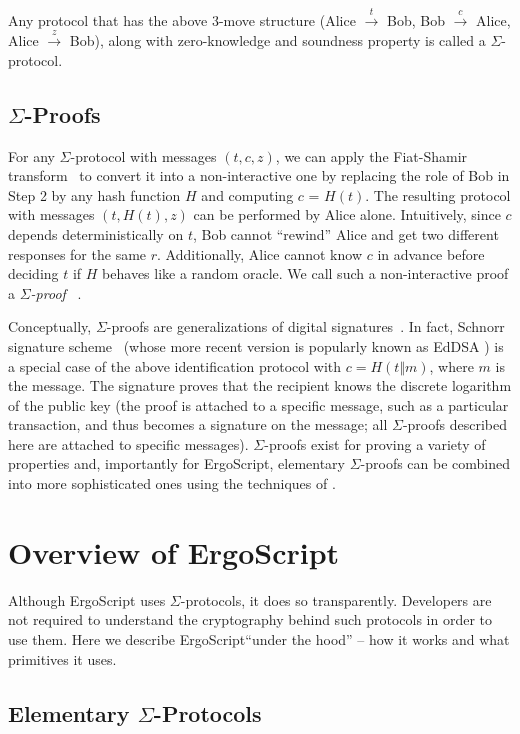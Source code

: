 \documentclass[11pt]{article}
\newcommand{\langname}{ErgoScript\xspace}
\begin{document}
Any protocol that has the above 3-move structure (Alice $\stackrel{t}{\rightarrow}$ Bob, Bob $\stackrel{c}{\rightarrow}$ Alice, Alice $\stackrel{z}{\rightarrow}$ Bob), along with zero-knowledge and soundness property is called a $\Sigma$-protocol. 

\subsection{$\Sigma$-Proofs}
For any $\Sigma$-protocol with messages $(t, c, z)$, we can apply the Fiat-Shamir transform~\cite{fiatshamir} to convert it into a non-interactive one by replacing the role of Bob in Step 2 by any hash function $H$ and computing $c$ = $H(t)$. The resulting protocol with messages $(t, H(t), z)$ can be performed by Alice alone. Intuitively, since $c$ depends deterministically on $t$, Bob cannot ``rewind'' Alice and get two different responses for the same $r$. Additionally, Alice cannot know $c$ in advance before deciding $t$ if $H$ behaves like a random oracle. We call such a non-interactive proof a {\em $\Sigma$-proof}~\cite{Cra96} .

Conceptually, $\Sigma$-proofs are generalizations of digital signatures~\cite{CL06}.
In fact, Schnorr signature scheme~\cite{Sch91} (whose more recent version is popularly known as EdDSA \cite{BDLSY12,rfc8032}) is a special case of the above identification protocol with $c = H(t \Vert m)$, where $m$ is the message. The signature proves that the recipient knows the discrete logarithm of the public key (the proof is attached to a specific message, such as a particular transaction, and thus becomes a signature on the message; all $\Sigma$-proofs described here are attached to specific messages). $\Sigma$-proofs exist for proving a variety of properties and, importantly for \langname, elementary $\Sigma$-proofs can be combined into more sophisticated ones using the techniques of \cite{CDS94}. 

\section{Overview of \langname}
Although \langname uses $\Sigma$-protocols, it does so transparently. Developers are not required to understand the cryptography behind such protocols in order to use them. Here we describe \langname ``under the hood'' -- how it works and what primitives it uses.

\subsection{Elementary $\Sigma$-Protocols}
\end{document}
